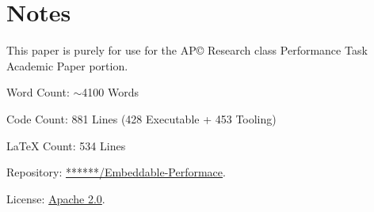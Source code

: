 \section*{Notes}
This paper is purely for use for the AP© Research class Performance Task Academic Paper portion.

Word Count: $\sim$4100 Words

Code Count: 881 Lines (428 Executable + 453 Tooling)

LaTeX Count: 534 Lines

Repository: \href{https://github.com/JRedOW/Embeddable-Performace}{******/Embeddable-Performace}.

License: \href{https://github.com/JRedOW/Embeddable-Performace/blob/main/LICENSE}{Apache 2.0}.
